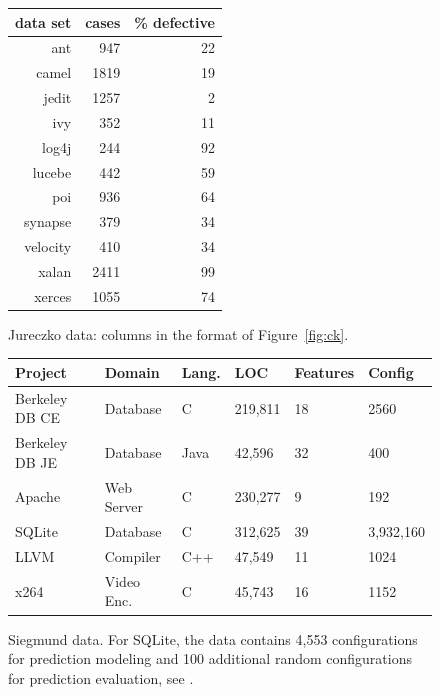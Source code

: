 \documentclass{sig-alternate}
\newcommand{\fig}[1]{Figure~\ref{fig:#1}}
\begin{document}
  
 \begin{figure}[!t]
 \small
 \begin{center}
 \begin{tabular}{r|rr}
 data set & cases & \% defective\\\hline
  ant &947& 22\\
  camel& 1819& 19\\
 jedit& 1257& 2\\
 ivy &352& 11\\
 log4j& 244 &92\\
 lucebe &442 &59\\
 poi& 936 &64\\
 synapse &379 &34\\
 velocity& 410& 34\\
 xalan& 2411& 99\\
 xerces &1055& 74
 \end{tabular}
 \end{center}
 \caption{ Jureczko data: columns in the format of \fig{ck}.}\label{fig:jd}
 \end{figure}
 
 \begin{figure}[!t]
\scriptsize
\begin{tabular}{llllll}
  \hline
  \rowcolor{lightgray}
Project & Domain & Lang. & LOC & Features & Config\\\hline
Berkeley DB CE & Database & C & 219,811 & 18 & 2560\\
Berkeley DB JE & Database & Java & 42,596 & 32  & 400\\
Apache & Web Server & C & 230,277 & 9 & 192\\
SQLite & Database & C & 312,625 & 39 & 3,932,160\\
LLVM & Compiler & C++ & 47,549 & 11 & 1024\\
x264 & Video Enc. & C& 45,743 & 16 & 1152\\\hline
\end{tabular}
 
\caption{Siegmund data.
For SQLite, the data  contains 4,553 configurations for prediction modeling and 100 additional random configurations for prediction evaluation, see \cite{vapp}.}\label{fig:cpm}
\end{figure}
\end{document}
